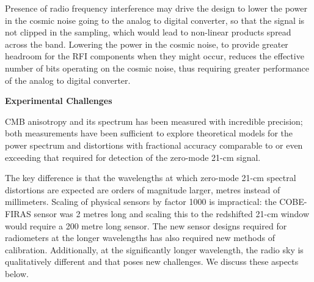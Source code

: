 \begin{itemize}
 Presence of radio frequency interference may drive the design to lower the power in the cosmic noise going to the analog to digital converter, so that the signal is not clipped in the sampling, which would lead to non-linear products spread across the band.  Lowering the power in the cosmic noise, to provide greater headroom for the RFI components when they might occur, reduces the effective number of bits operating on the cosmic noise, thus requiring greater performance of the analog to digital converter.
   
\end{itemize}

\textbf{Experimental Challenges}

CMB anisotropy and its spectrum has been measured with incredible precision; both measurements have been sufficient to explore theoretical models for the power spectrum and distortions with fractional accuracy comparable to or even exceeding that required for detection of the zero-mode 21-cm signal. 

The key difference is that the wavelengths at which zero-mode 21-cm spectral distortions are expected are orders of magnitude larger, metres instead of millimeters.  Scaling of physical sensors by factor 1000 is impractical: the COBE-FIRAS sensor was 2 metres long and scaling this to the redshifted 21-cm window would require a 200 metre long sensor.  The new sensor designs required for radiometers at the longer wavelengths has also required new methods of calibration.  Additionally, at the significantly longer wavelength, the radio sky is qualitatively different and that poses new challenges.  We discuss these aspects below.

